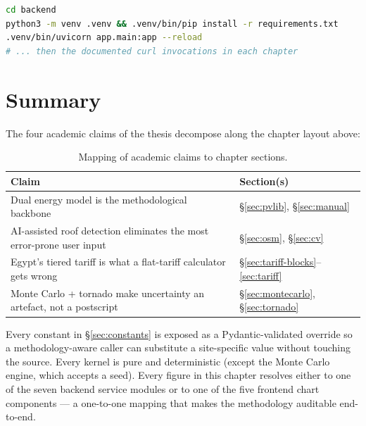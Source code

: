 \begin{lstlisting}[language=bash]
cd backend
python3 -m venv .venv && .venv/bin/pip install -r requirements.txt
.venv/bin/uvicorn app.main:app --reload
# ... then the documented curl invocations in each chapter
\end{lstlisting}

\section{Summary}

The four academic claims of the thesis decompose along the chapter
layout above:

\begin{table}[!htbp]
\centering
\footnotesize
\begin{tabularx}{\linewidth}{@{}X l@{}}
\toprule
\textbf{Claim} & \textbf{Section(s)} \\
\midrule
Dual energy model is the methodological backbone
  & \S\ref{sec:pvlib}, \S\ref{sec:manual} \\
AI-assisted roof detection eliminates the most error-prone user input
  & \S\ref{sec:osm}, \S\ref{sec:cv} \\
Egypt's tiered tariff is what a flat-tariff calculator gets wrong
  & \S\ref{sec:tariff-blocks}--\ref{sec:tariff} \\
Monte Carlo + tornado make uncertainty an artefact, not a postscript
  & \S\ref{sec:montecarlo}, \S\ref{sec:tornado} \\
\bottomrule
\end{tabularx}
\caption{Mapping of academic claims to chapter sections.}
\label{tab:claims}
\end{table}

Every constant in \S\ref{sec:constants} is exposed as a
Pydantic-validated override so a methodology-aware caller can
substitute a site-specific value without touching the source. Every
kernel is pure and deterministic (except the Monte Carlo engine,
which accepts a seed). Every figure in this chapter resolves either
to one of the seven backend service modules or to one of the five
frontend chart components --- a one-to-one mapping that makes the
methodology auditable end-to-end.
